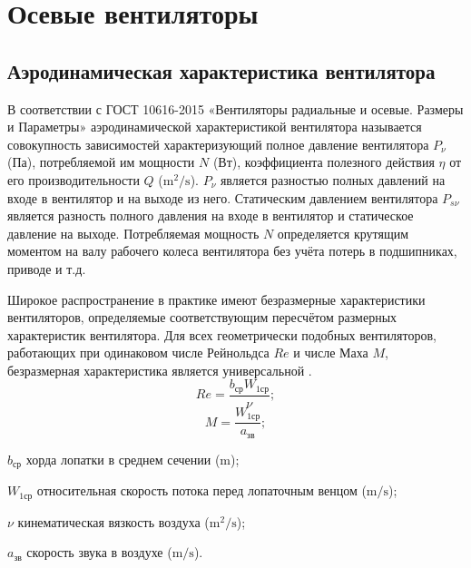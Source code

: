 \newcommand{\Ht}{\bar{H}_\text{т} }
\newcommand{\ca}{\bar{c}_{a} }


\chapter{Осевые вентиляторы}\label{ch:ch1}

\section{Аэродинамическая характеристика вентилятора}\label{sec:ch1/sec1}

В соответствии с ГОСТ 10616-2015 «Вентиляторы радиальные и осевые. Размеры и Параметры» \cite{gost10616} аэродинамической характеристикой вентилятора называется совокупность зависимостей характеризующий полное давление вентилятора \(P_\nu\) (Па), потребляемой им мощности \(N\) (Вт), коэффициента полезного действия \(\eta\) от его производительности \(Q\) ($\si\meter^2/\si\second$). \(P_\nu\) является разностью полных давлений на входе в вентилятор и на выходе из него. Статическим давлением вентилятора \(P_{s\nu}\) является разность полного давления на входе в вентилятор и статическое давление на выходе. Потребляемая мощность \(N\) определяется крутящим моментом на валу рабочего колеса вентилятора без учёта потерь в подшипниках, приводе и т.д. 

Широкое распространение в практике имеют безразмерные характеристики вентиляторов, определяемые соответствующим пересчётом размерных характеристик вентилятора. Для всех геометрически подобных вентиляторов, работающих при одинаковом числе Рейнольдса \(Re\) и числе Маха \(M\), безразмерная характеристика является универсальной \cite{Brusilovskiy1984}. 
\begin{equation}
	Re = \frac{b_{\text{ср}} W_{1\text{ср}}}{\nu};
\end{equation}
\begin{equation}
	M = \frac{W_{1\text{ср}}}{a_{\text{зв}}};
\end{equation}

\begin{eqexpl} 
\item{\(b_{\text{ср}}\)} хорда лопатки в среднем сечении ($\si\meter$);
\item{\(W_{1\text{ср}}\)} относительная скорость потока перед лопаточным венцом ($\si\meter/\si\second$);
\item{\(\nu\)} кинематическая вязкость воздуха ($\si\meter^2/\si\second$);
\item{\(a_{\text{зв}}\)} скорость звука в воздухе ($\si\meter/\si\second$).
\end{eqexpl}

